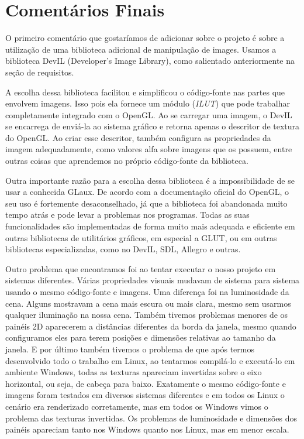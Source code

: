 \documentclass[a4paper,10pt]{article}
\begin{document}
\section{Comentários Finais}
O primeiro comentário que gostaríamos de adicionar sobre o projeto é sobre a utilização de uma biblioteca adicional de manipulação de images. Usamos a biblioteca DevIL (Developer's Image Library), como salientado anteriormente na seção de requisitos.

A escolha dessa biblioteca facilitou e simplificou o código-fonte nas partes que envolvem imagens. Isso pois ela fornece um módulo (\emph{ILUT}) que pode trabalhar completamente integrado com o OpenGL. Ao se carregar uma imagem, o DevIL se encarrega de enviá-la ao sistema gráfico e retorna apenas o descritor de textura do OpenGL. Ao criar esse descritor, também configura as propriedades da imagem adequadamente, como valores alfa sobre imagens que os possuem, entre outras coisas que aprendemos no próprio código-fonte da biblioteca.

Outra importante razão para a escolha dessa biblioteca é a impossibilidade de se usar a conhecida GLaux. De acordo com a documentação oficial do OpenGL, o seu uso é fortemente desaconselhado, já que a biblioteca foi abandonada muito tempo atrás e pode levar a problemas nos programas. Todas as suas funcionalidades são implementadas de forma muito mais adequada e eficiente em outras bibliotecas de utilitários gráficos, em especial a GLUT, ou em outras bibliotecas especializadas, como no DevIL, SDL, Allegro e outras.


Outro problema que encontramos foi ao tentar executar o nosso projeto em sistemas diferentes. Várias propriedades visuais mudavam de sistema para sistema usando o mesmo código-fonte e imagens. Uma diferença foi na luminosidade da cena. Alguns mostravam a cena mais escura ou mais clara, mesmo sem usarmos qualquer iluminação na nossa cena. Também tivemos problemas menores de os painéis 2D aparecerem a distâncias diferentes da borda da janela, mesmo quando configuramos eles para terem posições e dimensões relativas ao tamanho da janela. E por último também tivemos o problema de que após termos desenvolvido todo o trabalho em Linux, ao tentarmos compilá-lo e executá-lo em ambiente Windows, todas as texturas apareciam invertidas sobre o eixo horizontal, ou seja, de cabeça para baixo. Exatamente o mesmo código-fonte e imagens foram testados em diversos sistemas diferentes e em todos os Linux o cenário era renderizado corretamente, mas em todos os Windows vimos o problema das texturas invertidas. Os problemas de luminosidade e dimensões dos painéis apareciam tanto nos Windows quanto nos Linux, mas em menor escala.
\end{document}
